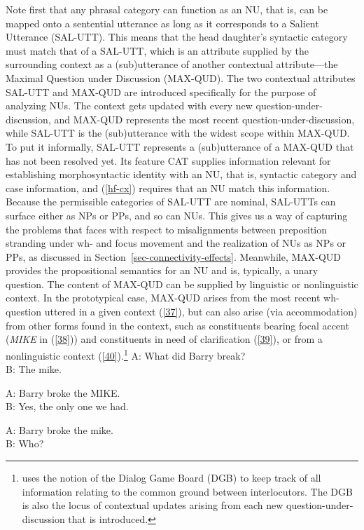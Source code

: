 \documentclass[output=paper
	        ,collection
	        ,collectionchapter
 	        ,biblatex
                ,babelshorthands
                ,newtxmath
                ,draftmode
                ,colorlinks, citecolor=brown
]{langscibook}
\begin{document}
{Note first that any phrasal category
can function as an NU, that is, can be mapped onto a sentential utterance as long as it corresponds to a Salient Utterance (SAL-UTT). This means that
the head daughter's syntactic category must match that of a SAL-UTT, which is an attribute supplied by the surrounding context as a (sub)utterance of another contextual attribute---the Maximal Question under Discussion (MAX-QUD). The two contextual attributes SAL-UTT and MAX-QUD are introduced specifically for the purpose of analyzing NUs. The context gets updated with every new question-under-discussion, and MAX-QUD represents the most recent question-under-discussion, while SAL-UTT is the (sub)utterance with the widest scope within MAX-QUD. To put it informally, SAL-UTT represents a (sub)utterance of a MAX-QUD that has not been resolved yet. Its feature CAT supplies information relevant for establishing morphosyntactic identity with an NU, that is, syntactic category and case information, and (\ref{hf-cx}) requires that an NU match this information. Because the permissible categories of SAL-UTT are nominal, SAL-UTTs can surface either as NPs or PPs, and so can NUs. This gives us a way of capturing the problems that \citet{Merchant2001, Merchant2005a} faces with respect to misalignments between preposition stranding under wh- and focus movement and the realization of NUs as NPs or PPs, as discussed in Section~\ref{sec-connectivity-effects}. Meanwhile, MAX-QUD provides the propositional semantics for an NU and is, typically, a unary question. The content of MAX-QUD can be supplied by linguistic or nonlinguistic context. In the prototypical case, MAX-QUD arises from the most recent wh-question uttered in a given context (\ref{37}), but can also arise (via accommodation) from other forms found in the context, such as constituents bearing focal accent ({\it MIKE} in (\ref{38})) and constituents in need of clarification (\ref{39}), or from a nonlinguistic context (\ref{40}).\footnote{\citet{Ginzburg2012} uses the notion of the Dialog Game Board (DGB) to keep track of all information relating to the common ground between interlocutors. The DGB is also the locus of contextual updates arising from each new question-under-discussion that is introduced.}
\ea
A: What did Barry break? \\
B: The mike.\label{37}
\z

\ea
A: Barry broke the MIKE. \\
B: Yes, the only one we had.\label{38}
\z

\ea
A: Barry broke the mike. \\
B: Who?\label{39}
\z

}
\end{document}
